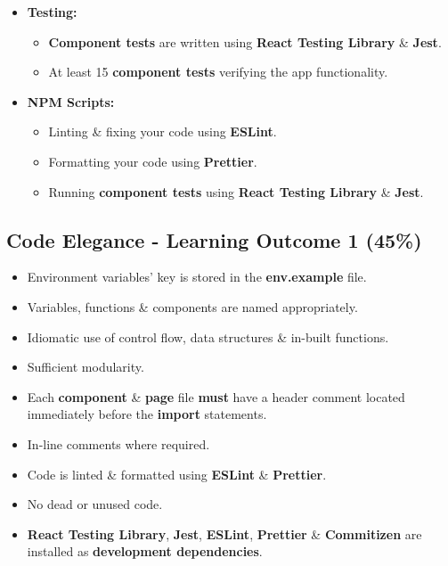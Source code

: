 \documentclass{article}
\begin{document}
\begin{itemize}
\item \textbf{Testing:}
\begin{itemize}
	\item \textbf{Component tests} are written using \textbf{React Testing Library} \& \textbf{Jest}.
	\item At least 15 \textbf{component tests} verifying the app functionality.
\end{itemize}
\item \textbf{NPM Scripts:}
\begin{itemize}
	\item Linting \& fixing your code using \textbf{ESLint}.
	\item Formatting your code using \textbf{Prettier}.
	\item Running \textbf{component tests} using \textbf{React Testing Library} \& \textbf{Jest}.
\end{itemize}
\end{itemize}

\subsection*{Code Elegance - Learning Outcome 1 (45\%)}
\begin{itemize}
	\item Environment variables' key is stored in the \textbf{env.example} file. 
	\item Variables, functions \& components are named appropriately.
	\item Idiomatic use of control flow, data structures \& in-built functions.
	\item Sufficient modularity.
	\item Each \textbf{component} \& \textbf{page} file \textbf{must} have a header comment located immediately before the \textbf{import} statements.
  \item In-line comments where required.
	\item Code is linted \& formatted using \textbf{ESLint} \& \textbf{Prettier}.
	\item No dead or unused code.
	\item \textbf{React Testing Library}, \textbf{Jest}, \textbf{ESLint}, \textbf{Prettier} \& \textbf{Commitizen} are installed as \textbf{development dependencies}.	
\end{itemize}
\end{document}
